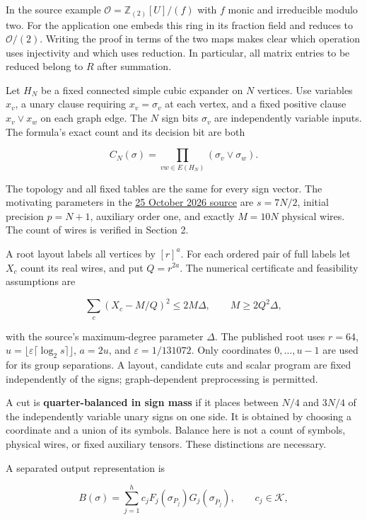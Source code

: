 \documentclass[
  11pt,
]{article}
\begin{document}
In the source example \(\mathcal O=\mathbb Z_{(2)}[U]/(f)\) with
\(f\) monic and irreducible modulo two. For the application one embeds
this ring in its fraction field and reduces to \(\mathcal O/(2)\).
Writing the proof in terms of the two maps makes clear which operation
uses injectivity and which uses reduction. In particular, all matrix
entries to be reduced belong to \(R\) after summation.

Let \(H_N\) be a fixed connected simple cubic expander on \(N\)
vertices. Use variables \(x_v\), a unary clause requiring
\(x_v=\sigma_v\) at each vertex, and a fixed positive clause
\(x_v\lor x_w\) on each graph edge. The \(N\) sign bits \(\sigma_v\) are
independently variable inputs. The formula's exact count and its
decision bit are both

\[
C_N(\sigma)=\prod_{vw\in E(H_N)}(\sigma_v\lor\sigma_w).
\tag{A}
\]

The topology and all fixed tables are the same for every sign vector.
The motivating parameters in the \href{https://github.com/openai/math/tree/main/preprints/The-Exponential-Time-Hypothesis-is-False-October-25-2026}{25 October 2026 source} are \(s=7N/2\), initial precision \(p=N+1\),
auxiliary order one, and exactly \(M=10N\) physical wires. The count of
wires is verified in Section 2.

A root layout labels all vertices by \([r]^a\). For each ordered pair of
full labels let \(X_c\) count its real wires, and put \(Q=r^{2a}\). The
numerical certificate and feasibility assumptions are

\[
\sum_c(X_c-M/Q)^2\le2M\Delta,\qquad M\ge2Q^2\Delta,
\tag{B}
\]

with the source's maximum-degree parameter \(\Delta\). The published
root uses \(r=64\), \(u=\lfloor\varepsilon\lceil\log_2s\rceil\rfloor\),
\(a=2u\), and \(\varepsilon=1/131072\). Only coordinates
\(0,\ldots,u-1\) are used for its group separations. A layout, candidate
cuts and scalar program are fixed independently of the signs;
graph-dependent preprocessing is permitted.

A cut is \textbf{quarter-balanced in sign mass} if it places between
\(N/4\) and \(3N/4\) of the independently variable unary signs on one
side. It is obtained by choosing a coordinate and a union of its
symbols. Balance here is not a count of symbols, physical wires, or
fixed auxiliary tensors. These distinctions are necessary.

A separated output representation is

\[
B(\sigma)=\sum_{j=1}^{h}c_j F_j(\sigma_{P_j})G_j(\sigma_{\overline P_j}),
\qquad c_j\in\mathcal K,
\tag{C}
\]
\end{document}
